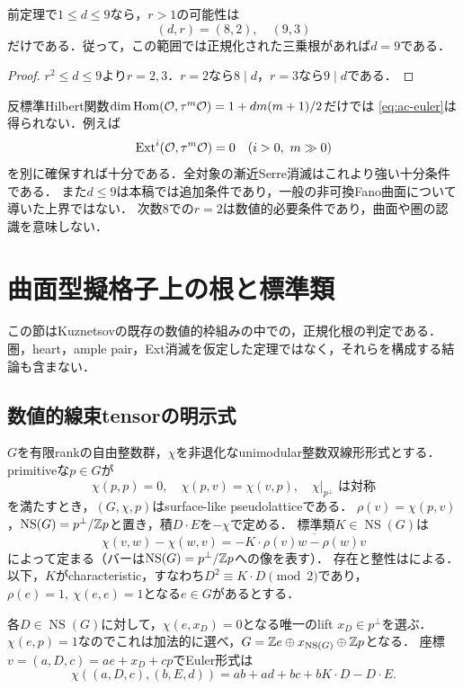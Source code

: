 \documentclass[11pt,a4paper]{ltjsarticle}
\begin{document}
\begin{corollary}[次数1から9の範囲]\label{cor:small-degree}
前定理で$1\le d\le9$なら，$r>1$の可能性は
\[
 (d,r)=(8,2),\quad(9,3)
\]
だけである．従って，この範囲では正規化された三乗根があれば$d=9$である．
\end{corollary}
\begin{proof}
$r^2\le d\le9$より$r=2,3$．$r=2$なら$8\mid d$，$r=3$なら$9\mid d$である．
\end{proof}

\begin{remark}[Hilbert関数とEuler多項式を区別する]\label{rem:vanishing}
反標準Hilbert関数$\dim\operatorname{Hom}(\mathcal O,\tau^m\mathcal O)=1+d m(m+1)/2$だけでは
\eqref{eq:ac-euler}は得られない．例えば
\[
 \operatorname{Ext}^i(\mathcal O,\tau^m\mathcal O)=0\quad(i>0,\ m\gg0)
\]
を別に確保すれば十分である．全対象の漸近Serre消滅はこれより強い十分条件である．
また$d\le9$は本稿では追加条件であり，一般の非可換Fano曲面について導いた上界ではない．
次数8での$r=2$は数値的必要条件であり，曲面や圏の認識を意味しない．
\end{remark}

\section{曲面型擬格子上の根と標準類}\label{sec:pseudolattice}
この節はKuznetsovの既存の数値的枠組み\cite[\S3--5]{Kuz}の中での，正規化根の判定である．
圏，heart，ample pair，Ext消滅を仮定した定理ではなく，それらを構成する結論も含まない．

\subsection{数値的線束tensorの明示式}
$G$を有限rankの自由整数群，$\chi$を非退化なunimodular整数双線形形式とする．
primitiveな$p\in G$が
\[
 \chi(p,p)=0,\quad\chi(p,v)=\chi(v,p),\quad
 \chi|_{p^\perp}\text{ は対称}
\]
を満たすとき，$(G,\chi,p)$はsurface-like pseudolatticeである\cite[Definition 3.1]{Kuz}．
$\rho(v)=\chi(p,v)$，$\operatorname{NS}(G)=p^\perp/\mathbb Z p$と置き，積$D\cdot E$を$-\chi$で定める．
標準類$K\in\operatorname{NS}(G)$は
\[
 \chi(v,w)-\chi(w,v)=-K\cdot\overline{\rho(v)w-\rho(w)v}
\]
によって定まる（バーは$\operatorname{NS}(G)=p^\perp/\mathbb Z p$への像を表す）．
存在と整性は\cite[Lemma 3.12]{Kuz}による．
以下，$K$がcharacteristic，すなわち$D^2\equiv K\cdot D\pmod2$であり，
$\rho(e)=1,\ \chi(e,e)=1$となる$e\in G$があるとする．

各$D\in\operatorname{NS}(G)$に対して，$\chi(e,x_D)=0$となる唯一のlift $x_D\in p^\perp$を選ぶ．
$\chi(e,p)=1$なのでこれは加法的に選べ，$G=\mathbb Z e\oplus x_{\operatorname{NS}(G)}\oplus\mathbb Z p$となる．
座標$v=(a,D,c)=ae+x_D+cp$でEuler形式は
\begin{equation}\label{eq:lattice-euler}
 \chi((a,D,c),(b,E,d))=ab+ad+bc+bK\cdot D-D\cdot E.
\end{equation}
\end{document}
